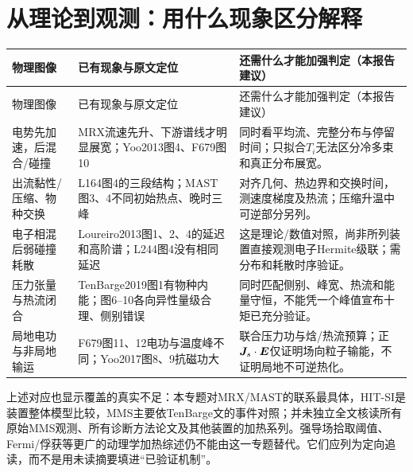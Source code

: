 \section{从理论到观测：用什么现象区分解释}
\begin{longtable}{P{35mm}P{55mm}P{58mm}}
\toprule 物理图像 & 已有现象与原文定位 & 还需什么才能加强判定（本报告建议）\\\midrule\endfirsthead
\toprule 物理图像 & 已有现象与原文定位 & 还需什么才能加强判定（本报告建议）\\\midrule\endhead
电势先加速，后混合/碰撞 & MRX流速先升、下游谱线才明显展宽；Yoo2013图4、F679图10 & 同时看平均流、完整分布与停留时间；只拟合$T_i$无法区分冷多束和真正分布展宽。\\
出流黏性/压缩、物种交换 & L164图4的三段结构；MAST图3、4不同初始热点、晚时三峰 & 对齐几何、热边界和交换时间，测速度梯度及热流；压缩升温中可逆部分另列。\\
电子相混后弱碰撞耗散 & Loureiro2013图1、2、4的延迟和高阶谱；L244图4没有相同延迟 & 这是理论/数值对照，尚非所列装置直接观测电子Hermite级联；需分布和耗散时序验证。\\
压力张量与热流闭合 & TenBarge2019图1有物种内能；图6--10各向异性量级合理、侧别错误 & 同时匹配侧别、峰宽、热流和能量守恒，不能凭一个峰值宣布十矩已充分验证。\\
局地电功与非局地输运 & F679图11、12电功与温度峰不同；Yoo2017图8、9抗磁功大 & 联合压力功与焓/热流预算；正$\bm{J}_s\cdot\bm{E}$仅证明场向粒子输能，不证明局地不可逆热化。\\
\bottomrule\end{longtable}

上述对应也显示覆盖的真实不足：本专题对MRX/MAST的联系最具体，HIT-SI是装置整体模型比较，MMS主要依TenBarge文的事件对照；并未独立全文核读所有原始MMS观测、所有诊断方法论文及其他装置的加热系列。强导场拾取阈值、Fermi/俘获等更广的动理学加热综述仍不能由这一专题替代。它们应列为定向追读，而不是用未读摘要填进“已验证机制”。
